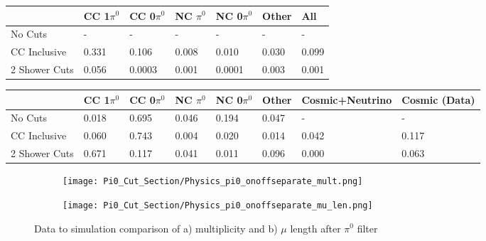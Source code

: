 \begin{table}[H]
\centering
{}
 \begin{tabular}{| l | l | l |l|l|l|l|}
 \hline
 & CC 1$\pi^0$ & CC 0$\pi^0$ & NC $\pi^0$ & NC 0$\pi^0$ & Other & All \\ [0.1ex] \hline
No Cuts & - & - & - & - & - & -\\
CC Inclusive & 0.331 & 0.106 & 0.008 & 0.010 & 0.030 & 0.099 \\ 
2 Shower Cuts & 0.056 & 0.0003 & 0.001 & 0.0001 & 0.003 & 0.001 \\ \hline
\end{tabular}
\end{table}

\begin{table}[H]
\centering
{}
 \begin{tabular}{| l | l | l |l|l|l|l|l|}
 \hline
  & CC 1$\pi^0$ & CC 0$\pi^0$ & NC $\pi^0$ & NC 0$\pi^0$ & Other& Cosmic+Neutrino& Cosmic (Data) \\ [0.1ex] \hline
No Cuts  & 0.018 &  0.695 & 0.046 & 0.194  & 0.047 & -&-\\
CC Inclusive & 0.060 & 0.743 & 0.004 & 0.020 & 0.014 & 0.042 & 0.117  \\ 
2 Shower Cuts  & 0.671 & 0.117 & 0.041 & 0.011 & 0.096 & 0.000 & 0.063 \\ \hline
\end{tabular}
\end{table}

\begin{figure}[H]
\centering
  \begin{subfigure}[t]{0.3\textwidth}
    \centering
\texttt{[image: Pi0\_Cut\_Section/Physics\_pi0\_onoffseparate\_mult.png]}
  \caption{ }
  \end{subfigure} 
  \hspace{10mm}
  \begin{subfigure}[t]{0.3\textwidth}
    \centering
    \texttt{[image: Pi0\_Cut\_Section/Physics\_pi0\_onoffseparate\_mu\_len.png]}
  \caption{ }
  \end{subfigure} 
  \caption{ Data to simulation comparison of a) multiplicity and b) $\mu$ length after $\pi^0$ filter }
\label{fig:physics_pi0_mu_len}
\end{figure}

